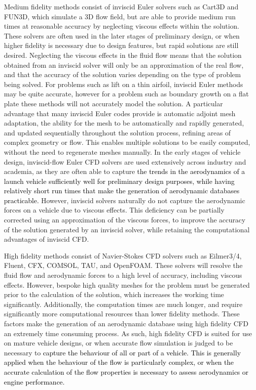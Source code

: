 Medium fidelity methods consist of inviscid Euler solvers such as Cart3D\cite{CART3D} and FUN3D\cite{fun3d}, which simulate a 3D flow field, but are able to provide medium run times at reasonable accuracy by neglecting viscous effects within the solution. These solvers are often used in the later stages of preliminary design, or when higher fidelity is necessary due to design features, but rapid solutions are still desired.  Neglecting the viscous effects in the fluid flow means that the solution obtained from an inviscid solver will only be an approximation of the real flow, and that the accuracy of the solution varies depending on the type of problem being solved. For problems such as lift on a thin airfoil, inviscid Euler methods may be quite accurate, however for a problem such as boundary growth on a flat plate these methods will not accurately model the solution\cite{NASAEuler}. A particular advantage that many inviscid Euler codes provide is automatic adjoint mesh adaptation, the ability for the mesh to be automatically and rapidly generated, and updated sequentially throughout the solution process, refining areas of complex geometry or flow. This enables multiple solutions to be easily computed, without the need to regenerate meshes manually. In the early stages of vehicle design, inviscid-flow Euler CFD solvers are used extensively across industry and academia\cite{Almosnino2016}, as they are often able to capture \textcolor{black}{the trends in the aerodynamics of a launch vehicle sufficiently well for preliminary design purposes, while having relatively short run times that make the generation of aerodynamic databases practicable.}
 However, inviscid solvers naturally do not capture the aerodynamic forces on a vehicle due to viscous effects. This deficiency can be partially corrected using an approximation of the viscous forces, to improve the accuracy of the solution generated by an inviscid solver, while retaining the computational advantages of inviscid CFD\cite{Ward2018}. 

High fidelity methods consist of Navier-Stokes CFD solvers such as Eilmer3/4\cite{Gollan2013b}, Fluent\cite{Ansys2014}, CFX\cite{CFX}, COMSOL\cite{comsol}, TAU\cite{Schwamborn2006}, and OpenFOAM\cite{openfoam}. These solvers will resolve the fluid flow and aerodynamic forces to a high level of accuracy, including viscous effects. However, bespoke high quality meshes for the problem must be generated prior to the calculation of the solution, which increases the working time significantly. Additionally, the computation times are much longer, and require significantly more computational resources than lower fidelity methods. These factors make the generation of an aerodynamic database using high fidelity CFD an extremely time consuming process. As such, high fidelity CFD is suited for use on mature vehicle designs, or when accurate flow simulation is judged to be necessary to \textcolor{black}{capture the behaviour of all or part of a vehicle. This is generally applied when the behaviour of the flow is particularly complex, or when the accurate calculation of the flow properties is necessary to assess aerodynamics or engine performance.}



